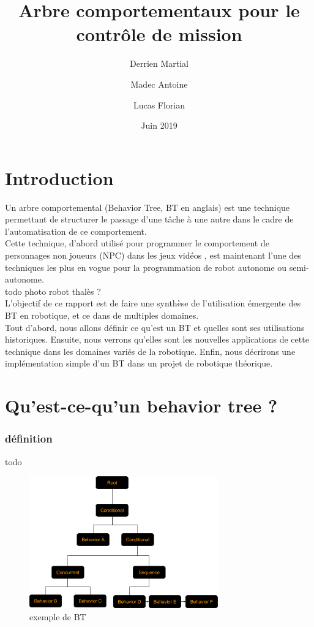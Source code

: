 \documentclass[titlepage]{article}
\title{Arbre comportementaux pour le contr\^ole de mission}
\author{
	Derrien Martial \\
	\and
	Madec Antoine \\
	\and
	Lucas Florian
}
\date{Juin 2019}
\begin{document}
	\maketitle
	\tableofcontents
	\hypersetup{linktocpage}
	
	\clearpage
	\part{Introduction}
	Un arbre comportemental (Behavior Tree, BT en anglais) est une
	technique permettant de structurer le passage d'une tâche à une autre dans 
	le cadre de l'automatisation de ce comportement.
	\\
	Cette technique, d'abord utilisé pour programmer le comportement de personnages non joueurs (NPC) dans les jeux vidéos \cite{wikipedia_BT}, est maintenant l'une des techniques les plus en vogue pour la programmation de robot autonome ou semi-autonome\cite{ros.org}.
	\\
	todo photo robot thalès ? 
	\\
	L'objectif de ce rapport est de faire une synthèse de l'utilisation émergente des BT en robotique, et ce dans de multiples domaines.
	\\
	Tout d'abord, nous allons définir ce qu'est un BT et quelles sont ses utilisations historiques. Ensuite, nous verrons qu'elles sont les nouvelles applications de cette technique dans les domaines variés de la robotique. Enfin, nous décrirons une implémentation simple d'un BT dans un projet de robotique théorique.
	\clearpage
	\part{Qu'est-ce-qu'un behavior tree ?}
	\section{définition}
	todo
	\\
	\begin{figure}[h!]
		\includegraphics[width=\linewidth]{img/behavior_trees_example.png}
		\caption{exemple de BT \cite{rasmussen}}
		\label{fig:BT1}
	\end{figure}
	\\
\end{document}

